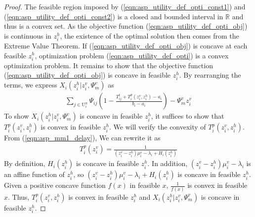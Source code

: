 \documentclass[10pt,journal, compsoc]{IEEEtran}
\begin{document}
\begin{proof}
The feasible region imposed by (\ref{eqn:asp_utility_def_opti_const1}) and (\ref{eqn:asp_utility_def_opti_const2}) is a closed and bounded interval in $\mathbb{R}$ and thus is a convex set. As the objective function (\ref{eqn:asp_utility_def_opti_obj}) is continuous in $z_i^h$, the existence of the optimal solution then comes from the Extreme Value Theorem. If (\ref{eqn:asp_utility_def_opti_obj}) is concave at each feasible $z_i^h$, optimization problem (\ref{eqn:asp_utility_def_opti}) is a convex optimization problem. It remains to show that the objective function (\ref{eqn:asp_utility_def_opti_obj}) is concave in feasible $z_i^h$. By rearranging the terms, we express $X_i(z_i^h|z_i^v,\Psi_m^v)$ as
\begin{equation}
\begin{aligned}
    \sum_{j \in \mathrm{U}_i^{n}}\Psi_{ij}(1-\frac{T_{ij}^t+T_i^p(z_i^v, z_i^h)-a_i}{b_i-a_i})- \Psi_m^v z_i^v 
\end{aligned}
\end{equation}
To show $X_i(z_i^h|z_i^v,\Psi_m^v)$ is concave in feasible $z_i^h$, it suffices to show that $T_i^p(z_i^v, z_i^h)$ is convex in feasible $z_i^h$. We will verify the convexity of $T_i^p(z_i^v, z_i^h)$. From (\ref{eqn:asp_mm1_delay}), We can rewrite it as
\begin{equation} 
\begin{aligned}
T_i^p(z_i^v)=\frac{1}{(z_i^v-z_i^h)\mu_i^v - \lambda_i + H_i(z_i^h)}
\end{aligned}
\end{equation}
By definition, $H_i(z_i^h)$ is concave in feasible $z_i^h$. In addition, $(z_i^v-z_i^h)\mu_i^v - \lambda_i$ is an affine function of $z_i^h$, so $(z_i^v-z_i^h)\mu_i^v - \lambda_i + H_i(z_i^h)$ is concave in feasible $z_i^h$. Given a positive concave function $f(x)$ in feasible $x$, $\frac{1}{f(x)}$ is convex in feasible $x$\cite[Chapter~3.2]{boyd2004convex}. Thus, $T_i^p(z_i^v, z_i^h)$ is convex in feasible $z_i^h$ and $X_i(z_i^h|z_i^v,\Psi_m^v)$ is concave in feasible $z_i^h$.
\end{proof}
\end{document}

